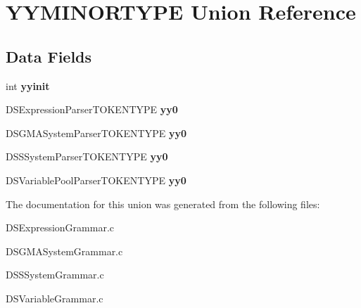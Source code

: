 \hypertarget{union_y_y_m_i_n_o_r_t_y_p_e}{
\section{YYMINORTYPE Union Reference}
\label{union_y_y_m_i_n_o_r_t_y_p_e}
}
\subsection*{Data Fields}
\begin{DoxyCompactItemize}
\item 
\hypertarget{union_y_y_m_i_n_o_r_t_y_p_e_a0cb008d540fdfbd8d959086ac51430d9}{
int {\bfseries yyinit}}
\label{union_y_y_m_i_n_o_r_t_y_p_e_a0cb008d540fdfbd8d959086ac51430d9}

\item 
\hypertarget{union_y_y_m_i_n_o_r_t_y_p_e_a2ad18825998bda35d621cc0601b20650}{
DSExpressionParserTOKENTYPE {\bfseries yy0}}
\label{union_y_y_m_i_n_o_r_t_y_p_e_a2ad18825998bda35d621cc0601b20650}

\item 
\hypertarget{union_y_y_m_i_n_o_r_t_y_p_e_ad859d3cbda74bf6a73a6e3f6d879a872}{
DSGMASystemParserTOKENTYPE {\bfseries yy0}}
\label{union_y_y_m_i_n_o_r_t_y_p_e_ad859d3cbda74bf6a73a6e3f6d879a872}

\item 
\hypertarget{union_y_y_m_i_n_o_r_t_y_p_e_ad8ffdba7cb90f213caad1dab4f05d207}{
DSSSystemParserTOKENTYPE {\bfseries yy0}}
\label{union_y_y_m_i_n_o_r_t_y_p_e_ad8ffdba7cb90f213caad1dab4f05d207}

\item 
\hypertarget{union_y_y_m_i_n_o_r_t_y_p_e_a90493e09bfbda4194f92efea0f194d71}{
DSVariablePoolParserTOKENTYPE {\bfseries yy0}}
\label{union_y_y_m_i_n_o_r_t_y_p_e_a90493e09bfbda4194f92efea0f194d71}

\end{DoxyCompactItemize}


The documentation for this union was generated from the following files:\begin{DoxyCompactItemize}
\item 
DSExpressionGrammar.c\item 
DSGMASystemGrammar.c\item 
DSSSystemGrammar.c\item 
DSVariableGrammar.c\end{DoxyCompactItemize}
